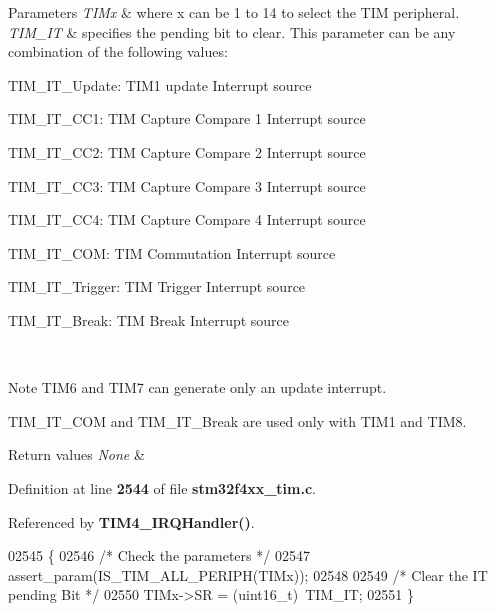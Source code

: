 \begin{DoxyParams}{Parameters}
{\em T\+I\+Mx} & where x can be 1 to 14 to select the T\+IM peripheral. \\
\hline
{\em T\+I\+M\+\_\+\+IT} & specifies the pending bit to clear. This parameter can be any combination of the following values\+: \begin{DoxyItemize}
\item T\+I\+M\+\_\+\+I\+T\+\_\+\+Update\+: T\+I\+M1 update Interrupt source \item T\+I\+M\+\_\+\+I\+T\+\_\+\+C\+C1\+: T\+IM Capture Compare 1 Interrupt source \item T\+I\+M\+\_\+\+I\+T\+\_\+\+C\+C2\+: T\+IM Capture Compare 2 Interrupt source \item T\+I\+M\+\_\+\+I\+T\+\_\+\+C\+C3\+: T\+IM Capture Compare 3 Interrupt source \item T\+I\+M\+\_\+\+I\+T\+\_\+\+C\+C4\+: T\+IM Capture Compare 4 Interrupt source \item T\+I\+M\+\_\+\+I\+T\+\_\+\+C\+OM\+: T\+IM Commutation Interrupt source \item T\+I\+M\+\_\+\+I\+T\+\_\+\+Trigger\+: T\+IM Trigger Interrupt source \item T\+I\+M\+\_\+\+I\+T\+\_\+\+Break\+: T\+IM Break Interrupt source\end{DoxyItemize}
\\
\hline
\end{DoxyParams}
\begin{DoxyNote}{Note}
T\+I\+M6 and T\+I\+M7 can generate only an update interrupt. 

T\+I\+M\+\_\+\+I\+T\+\_\+\+C\+OM and T\+I\+M\+\_\+\+I\+T\+\_\+\+Break are used only with T\+I\+M1 and T\+I\+M8.
\end{DoxyNote}

\begin{DoxyRetVals}{Return values}
{\em None} & \\
\hline
\end{DoxyRetVals}


Definition at line \textbf{ 2544} of file \textbf{ stm32f4xx\+\_\+tim.\+c}.



Referenced by \textbf{ T\+I\+M4\+\_\+\+I\+R\+Q\+Handler()}.


\begin{DoxyCode}
02545 \{
02546   \textcolor{comment}{/* Check the parameters */}
02547   assert_param(IS_TIM_ALL_PERIPH(TIMx));
02548 
02549   \textcolor{comment}{/* Clear the IT pending Bit */}
02550   TIMx->SR = (uint16\_t)~TIM\_IT;
02551 \}
\end{DoxyCode}
\mbox{\label{group__TIM__Group5_ga24700389cfa3ea9b42234933b23f1399}} 
